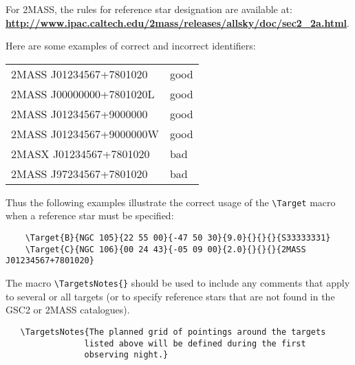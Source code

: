 \documentclass{article}
\begin{document}

For 2MASS, the rules for reference star designation are available at:\\
  \href{http://www.ipac.caltech.edu/2mass/releases/allsky/doc/sec2_2a.html}{\bf
    \underline{http://www.ipac.caltech.edu/2mass/releases/allsky/doc/sec2\_2a.html}}. 

\smallskip

Here are some examples of correct and incorrect identifiers:

\begin{center}
\begin{tabular}{ll}
 2MASS J01234567+7801020      & good\\
 2MASS J00000000+7801020L     & good\\
 2MASS J01234567+9000000      & good\\
 2MASS J01234567+9000000W     & good\\
 2MASX J01234567+7801020      & bad\\
 2MASS J97234567+7801020      & bad\\
\end{tabular}
\end{center}

Thus the following examples illustrate the correct usage of the
\verb|\Target| macro when a reference star must be specified:
\begin{verbatim}
    \Target{B}{NGC 105}{22 55 00}{-47 50 30}{9.0}{}{}{}{S33333331}
    \Target{C}{NGC 106}{00 24 43}{-05 09 00}{2.0}{}{}{}{2MASS J01234567+7801020}
\end{verbatim}

The macro \verb|\TargetsNotes{}| should be used to include any
comments that apply to several or all targets (or to specify reference
stars that are not found in the GSC2 or 2MASS catalogues).
\begin{verbatim}
   \TargetsNotes{The planned grid of pointings around the targets 
                listed above will be defined during the first 
                observing night.}
\end{verbatim}
\end{document}

